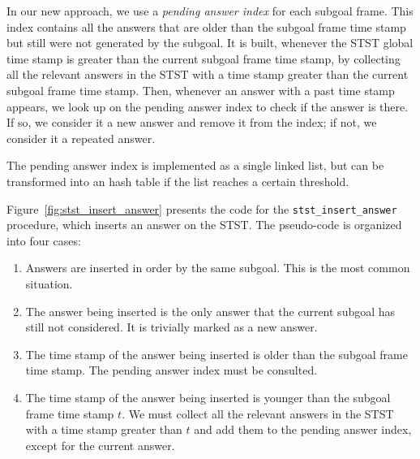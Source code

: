 In our new approach, we use a \textit{pending answer index} for each subgoal frame.
This index contains all the answers that are older than the subgoal frame time stamp
but still were not generated by the subgoal. It is built, whenever the STST
global time stamp is greater than the current subgoal frame time stamp, by
collecting all the relevant answers in the STST with a time stamp greater than
the current subgoal frame time stamp. Then, whenever an answer with a past time stamp appears,
we look up on the pending answer index to check if the answer is there. If so,
we consider it a new answer and remove it from the index; if not, we consider it a repeated answer.

The pending answer index is implemented as a single linked list, but can be transformed
into an hash table if the list reaches a certain threshold.

Figure~\ref{fig:stst_insert_answer} presents the code for the \texttt{stst\_insert\_answer} procedure,
which inserts an answer on the STST. The pseudo-code is organized into four cases:

\begin{enumerate}
   \item Answers are inserted in order by the same subgoal. This is the most common situation.
   \item The answer being inserted is the only answer that the current subgoal has still not considered.
   It is trivially marked as a new answer.
   \item The time stamp of the answer being inserted is older than the subgoal frame time stamp.
   The pending answer index must be consulted.
   \item The time stamp of the answer being inserted is younger than the subgoal frame time stamp $t$.
   We must collect all the relevant answers in the STST with a time stamp greater than $t$
   and add them to the pending answer index, except for the current answer.
\end{enumerate}


